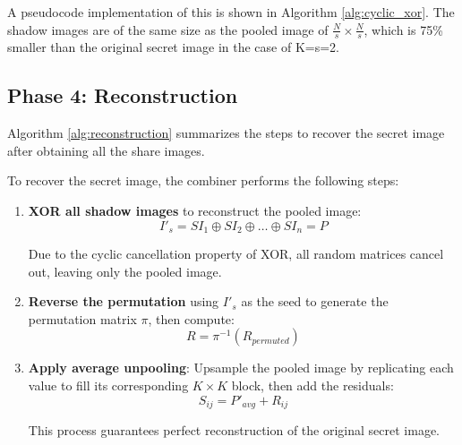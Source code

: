A pseudocode implementation of this is shown in Algorithm \ref{alg:cyclic_xor}. The shadow images are of the same size as the pooled image of $\frac{N}{s} \times \frac{N}{s}$, which is 75\% smaller than the original secret image in the case of K=s=2.


\subsection{Phase 4: Reconstruction}
Algorithm \ref{alg:reconstruction} summarizes the steps to recover the secret image after obtaining all the share images.


To recover the secret image, the combiner performs the following steps:


\begin{enumerate}
\item \textbf{XOR all shadow images} to reconstruct the pooled image:
\begin{equation}
I'_s = SI_1 \oplus SI_2 \oplus \ldots \oplus SI_n = P
\end{equation}

Due to the cyclic cancellation property of XOR, all random matrices cancel out, leaving only the pooled image.

\item \textbf{Reverse the permutation} using $I'_s$ as the seed to generate the permutation matrix $\pi$, then compute:
\begin{equation}
R = \pi^{-1}(R_{permuted})
\end{equation}

\item \textbf{Apply average unpooling}: Upsample the pooled image by replicating each value to fill its corresponding $K \times K$ block, then add the residuals:
\begin{equation}
S_{ij} = P'_{avg} + R_{ij}
\end{equation}

This process guarantees perfect reconstruction of the original secret image.
\end{enumerate}

